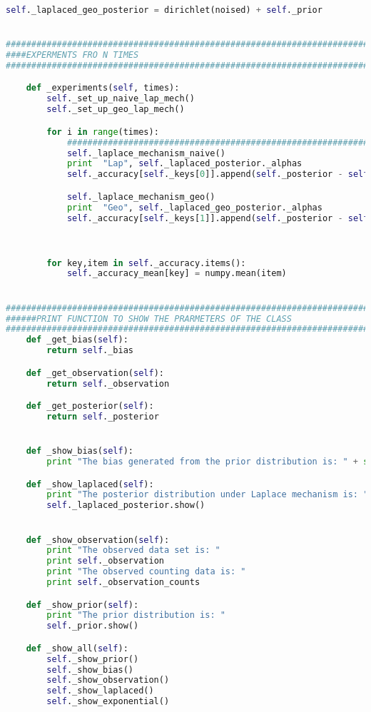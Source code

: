 \begin{lstlisting}[label=code-p1-2, language=Python, caption=Python Code For Bayesian Inference Class]
		self._laplaced_geo_posterior = dirichlet(noised) + self._prior


#################################################################################
####EXPERMENTS FRO N TIMES
#################################################################################

	def _experiments(self, times):
		self._set_up_naive_lap_mech()
		self._set_up_geo_lap_mech()

		for i in range(times):
			###################################################################
			self._laplace_mechanism_naive()
			print  "Lap", self._laplaced_posterior._alphas
			self._accuracy[self._keys[0]].append(self._posterior - self._laplaced_posterior)

			self._laplace_mechanism_geo()
			print  "Geo", self._laplaced_geo_posterior._alphas
			self._accuracy[self._keys[1]].append(self._posterior - self._laplaced_geo_posterior)


			
		for key,item in self._accuracy.items():
			self._accuracy_mean[key] = numpy.mean(item)


#####################################################################################
######PRINT FUNCTION TO SHOW THE PRARMETERS OF THE CLASS
##################################################################################	
	def _get_bias(self):
		return self._bias

	def _get_observation(self):
		return self._observation

	def _get_posterior(self):
		return self._posterior


	def _show_bias(self):
		print "The bias generated from the prior distribution is: " + str(self._bias)

	def _show_laplaced(self):
		print "The posterior distribution under Laplace mechanism is: "
		self._laplaced_posterior.show()


	def _show_observation(self):
		print "The observed data set is: "
		print self._observation
		print "The observed counting data is: "
		print self._observation_counts

	def _show_prior(self):
		print "The prior distribution is: "
		self._prior.show()

	def _show_all(self):
		self._show_prior()
		self._show_bias()
		self._show_observation()
		self._show_laplaced()
		self._show_exponential()

\end{lstlisting}



